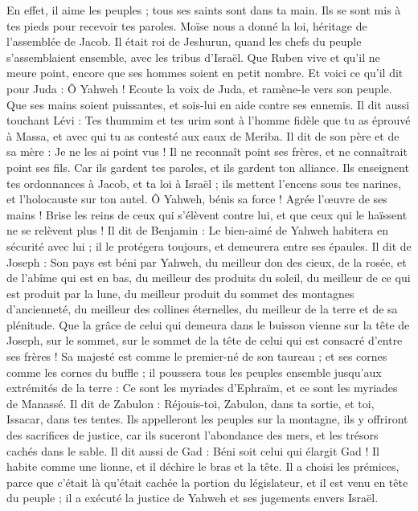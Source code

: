 \begin{multicols}{2}
En effet, il aime les peuples ; tous ses saints sont dans ta main. Ils se sont mis à tes pieds pour recevoir tes paroles.
Moïse nous a donné la loi, héritage de l'assemblée de Jacob.
Il était roi de Jeshurun\FTNT{}, quand les chefs du peuple s’assemblaient ensemble, avec les tribus d'Israël.
Que Ruben vive et qu'il ne meure point, encore que ses hommes soient en petit nombre.
Et voici ce qu’il dit pour Juda : Ô Yahweh ! Ecoute la voix de Juda, et ramène-le vers son peuple. Que ses mains soient puissantes, et sois-lui en aide contre ses ennemis.
Il dit aussi touchant Lévi : Tes thummim et tes urim sont à l'homme fidèle que tu as éprouvé à Massa, et avec qui tu as contesté aux eaux de Meriba.
Il dit de son père et de sa mère : Je ne les ai point vus ! Il ne reconnaît point ses frères, et ne connaîtrait point ses fils. Car ils gardent tes paroles, et ils gardent ton alliance.
Ils enseignent tes ordonnances à Jacob, et ta loi à Israël ; ils mettent l’encens sous tes narines, et l’holocauste sur ton autel.
Ô Yahweh, bénis sa force ! Agrée l'œuvre de ses mains ! Brise les reins de ceux qui s'élèvent contre lui, et que ceux qui le haïssent ne se relèvent plus !
Il dit de Benjamin : Le bien-aimé de Yahweh habitera en sécurité avec lui ; il le protégera toujours, et demeurera entre ses épaules.
Il dit de Joseph : Son pays est béni par Yahweh, du meilleur don des cieux, de la rosée, et de l'abîme qui est en bas,
du meilleur des produits du soleil, du meilleur de ce qui est produit par la lune,
du meilleur produit du sommet des montagnes d’ancienneté, du meilleur des collines éternelles,
du meilleur de la terre et de sa plénitude. Que la grâce de celui qui demeura dans le buisson vienne sur la tête de Joseph, sur le sommet, sur le sommet de la tête de celui qui est consacré d'entre ses frères !
Sa majesté est comme le premier-né de son taureau ; et ses cornes comme les cornes du buffle ; il poussera tous les peuples ensemble jusqu’aux extrémités de la terre : Ce sont les myriades d'Ephraïm, et ce sont les myriades de Manassé.
Il dit de Zabulon : Réjouis-toi, Zabulon, dans ta sortie, et toi, Issacar, dans tes tentes.
Ils appelleront les peuples sur la montagne, ils y offriront des sacrifices de justice, car ils suceront l'abondance des mers, et les trésors cachés dans le sable.
Il dit aussi de Gad : Béni soit celui qui élargit Gad ! Il habite comme une lionne, et il déchire le bras et la tête.
Il a choisi les prémices, parce que c'était là qu'était cachée la portion du législateur, et il est venu en tête du peuple ; il a exécuté la justice de Yahweh et ses jugements envers Israël.

\end{multicols}
